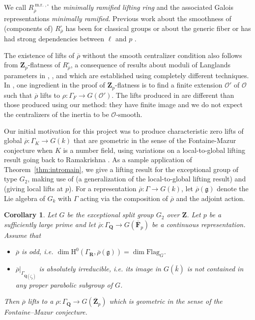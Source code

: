 \documentclass[11pt, letterpaper,english]{amsart}
\theoremstyle{plain}
\newtheorem{corollary}[lem]{Corollary}
\theoremstyle{definition}
\numberwithin{equation}{section}
\numberwithin{lem}{section}
\newcommand{\mathfont}{\mathbf}
\newcommand{\ZZ}{\mathfont Z}
\newcommand{\QQ}{\mathfont Q}
\newcommand{\FF}{\mathfont F}
\newcommand{\Fbar}{\overline{\FF}}
\newcommand{\Fpbar}{\Fbar_p}
\newcommand{\fg}{\mathfrak{g}}
\newcommand{\bR}{\mathfont{R}}
\newcommand{\bZ}{\mathfont{Z}}
\newcommand{\cO}{\mathcal{O}}
\newcommand{\kbar}{\bar{k}}
\newcommand{\Zpbar}{\overline{\mathfont{Z}}_p}
\newcommand{\rhobar}{{\overline{\rho}}}
\newcommand{\gma}[1]{\Gamma_{#1}}
\DeclareMathOperator{\mr}{m.r.}
\renewcommand{\mr}{\operatorname{m.r.}}
\begin{document}
We call %
$R_{\rhobar}^{\mr,\square}$ the \emph{minimally ramified lifting ring} and the associated Galois representations \emph{minimally ramified}. %
Previous work about the smoothness of (components of) $R_{\rhobar}^{\square}$ has been for classical groups \cite{cht08,Booher19} or about the generic fiber \cite{bp19,bg19} or has had strong dependencies between $\ell$ and $p$ \cite[\S 5]{DHKM}.

%


The existence of lifts of $\rhobar$ without the smooth centralizer condition also follows from $\bZ_p$-flatness of $R_{\rhobar}^{\square}$, a consequence of results about moduli of Langlands parameters in \cite{DHKM}, \cite{Fargues-Scholze}, and \cite{Zhu} which are established using completely different techniques.  In \cite{DHKM}, one ingredient in the proof of $\bZ_p$-flatness is to find a finite extension $\cO'$ of $\cO$ such that $\rhobar$ lifts to $\rho: \Gamma_F \to G(\cO')$. The lifts produced in \cite{DHKM} are different than those produced using our method: they have finite image and we do not expect the centralizers of the inertia to be $\cO$-smooth. 

%


%
%
%

Our initial motivation for this project was to produce characteristic zero lifts of global $\rhobar : \Gamma_K \to G(k)$ that are geometric in the sense of the Fontaine-Mazur conjecture when $K$ is a number field, using variations on a local-to-global lifting result going back to Ramakrishna \cite{ram02}.  As a sample application of Theorem~\ref{thm:intromain}, we give a lifting result for the exceptional group of type $G_2$, making use of \cite[Theorem A]{fkp21} (a generalization of the local-to-global lifting result) and \cite[Theorem C]{lin_g2} (giving local lifts at $p$).  For a representation $\rhobar : \Gamma \to G(k)$, let $\rhobar(\fg)$ denote the Lie algebra of $G_k$ with $\Gamma$ acting via the composition of $\rhobar$ and the adjoint action. 

%
%
%

\begin{corollary} \label{corollary:lifting}
Let $G$ be the exceptional split group $G_2$ over $\ZZ$. Let $p$ be a sufficiently large prime and let $\rhobar \colon \Gamma_{\QQ} \to G(\Fpbar)$ be a continuous representation. Assume that 
\begin{itemize}
    \item $\rhobar$ is odd, i.e. $\dim \mathrm{H}^0(\gma{\bR}, \rhobar(\fg))=\dim \mathrm{Flag}_{G}$.
    \item $\rhobar|_{\gma{\QQ(\zeta_p)}}$ is absolutely irreducible, i.e. its image in $G(\kbar)$ is not contained in any proper parabolic subgroup of $G$. 
\end{itemize}
Then $\rhobar$ lifts to a $\rho \colon \gma{\QQ} \to G(\Zpbar)$ which is geometric in the sense of the Fontaine--Mazur conjecture.
\end{corollary}
\end{document}
